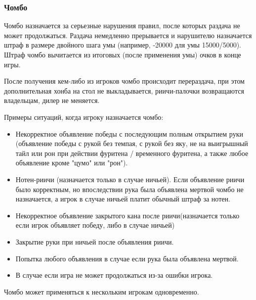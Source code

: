 \subsubsection{Чомбо}
Чомбо назначается за серьезные нарушения правил, после которых раздача не может продолжаться. Раздача немедленно прерывается и нарушителю назначается штраф в размере двойного шага умы (например, -20000 для умы 15000/5000). Штраф чомбо вычитается из итоговых (после применения умы) очков  в конце игры. 

После получения кем-либо из игроков чомбо происходит перераздача, при этом дополнительная хонба на стол не выкладывается, риичи-палочки возвращаются владельцам, дилер не меняется.

Примеры ситуаций, когда игроку назначается чомбо:
\begin{itemize}
	\item Некорректное объявление победы с последующим полным открытием руки (объявление победы с рукой без темпая, с рукой без яку, не на выигрышный тайл или рон при действии фуритена / временного фуритена, а также любое объявление кроме "цумо" или "рон").
	\item Нотен-риичи (назначается только в случае ничьей). Если объявление риичи было корректным, но впоследствии рука была объявлена мертвой чомбо не назначается, а игрок в случае ничьей платит обычный штраф за нотен.
	\item Некорректное объявление закрытого кана после риичи(назначается только если игрок объявляет победу, либо в случае ничьей)
	\item Закрытие руки при ничьей после объявления риичи.
	\item Попытка любого объявления в случае если рука была объявлена мертвой. 
	\item В случае если игра не может продолжаться из-за ошибки игрока.
\end{itemize}

Чомбо может применяться к нескольким игрокам одновременно.


